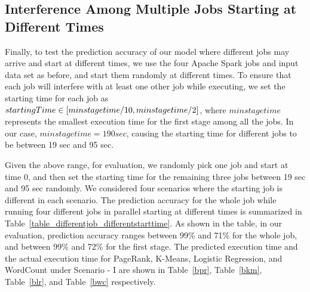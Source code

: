 \subsection{Interference Among Multiple Jobs Starting at Different Times}
\label{newsection}
Finally, to test the prediction accuracy of our model where different jobs may arrive and start at different times, we use the four Apache Spark jobs and input data set as before, and start them randomly at different times. To ensure that each job will interfere with at least one other job while executing, we set the starting time for each job as $startingTime \in [minstagetime / 10, \\
minstagetime / 2]$, where $minstagetime$ represents the smallest execution time for the first stage among all the jobs. In our case, $minstagetime=190 sec$, causing the starting time for different jobs to be between 19 sec and 95 sec.

\noindent
Given the above range, for evaluation, we randomly pick one job and start at time 0, and then 
set the starting time for the remaining three jobs between 19 sec and 95 sec randomly. 
We considered four scenarios where the starting job is different in each scenario. The prediction accuracy for the whole job while running four different jobs in parallel starting at different times is summarized in Table~\ref{table_differentjob_differentstarttime}. As shown in the table, in our evaluation, prediction accuracy ranges between 99\% and 71\% for the whole job, and between 99\% and 72\% for the first stage. The predicted execution time and the actual execution time for PageRank, K-Means, Logistic Regression, and WordCount under Scenario - I are shown in Table~\ref{bpr}, Table~\ref{bkm}, Table~\ref{blr}, and Table~\ref{bwc} respectively. 



